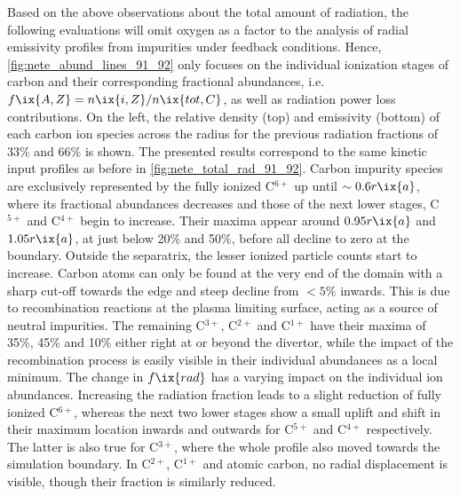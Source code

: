 %
        Based on the above observations about the total amount of radiation, the following evaluations will omit oxygen as a factor to the analysis of radial emissivity profiles from impurities under feedback conditions. Hence, \cref{fig:nete_abund_lines_91_92} only focuses on the individual ionization stages of carbon and their corresponding fractional abundances, i.e. $f\ix{A,Z}=n\ix{i,Z}/n\ix{tot,C}$, as well as radiation power loss contributions. On the left, the relative density (top) and emissivity (bottom) of each carbon ion species across the radius for the previous radiation fractions of 33\% and 66\% is shown. The presented results correspond to the same kinetic input profiles as before in \cref{fig:nete_total_rad_91_92}. Carbon impurity species are exclusively represented by the fully ionized C$^{6+}$ up until $\sim0.6r\ix{a}$, where its fractional abundances decreases and those of the next lower stages, C$^{5+}$ and C$^{4+}$ begin to increase. Their maxima appear around $0.95r\ix{a}$ and $1.05r\ix{a}$, at just below 20\% and 50\%, before all decline to zero at the boundary. Outside the separatrix, the lesser ionized particle counts start to increase. Carbon atoms can only be found at the very end of the domain with a sharp cut-off towards the edge and steep decline from $<5\%$ inwards. This is due to recombination reactions at the plasma limiting surface, acting as a source of neutral impurities. The remaining C$^{3+}$, C$^{2+}$ and C$^{1+}$ have their maxima of 35\%, 45\% and 10\% either right at or beyond the divertor, while the impact of the recombination process is easily visible in their individual abundances as a local minimum. The change in $f\ix{rad}$ has a varying impact on the individual ion abundances. Increasing the radiation fraction leads to a slight reduction of fully ionized C$^{6+}$, whereas the next two lower stages show a small uplift and shift in their maximum location inwards and outwards for C$^{5+}$ and C$^{4+}$ respectively. The latter is also true for C$^{3+}$, where the whole profile also moved towards the simulation boundary. In C$^{2+}$, C$^{1+}$ and atomic carbon, no radial displacement is visible, though their fraction is similarly reduced.\\%
